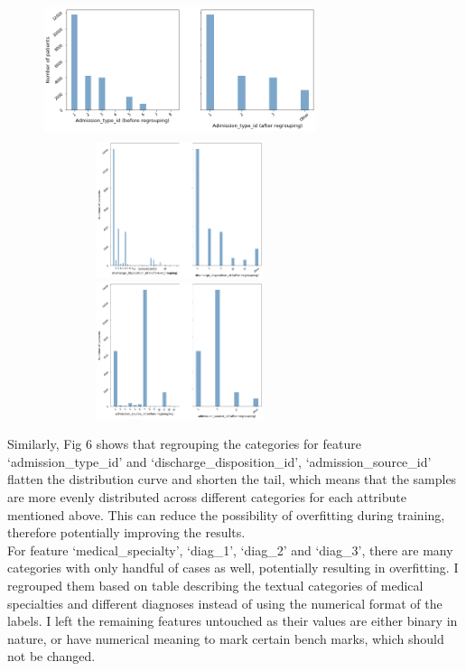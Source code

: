 \documentclass[letterpaper, 12 pt, conference]{ieeeconf}  %
\begin{document}
\begin{figure}[h]
  \includegraphics[width=8cm, height=4cm]{./figs/admin_type.png}
  \includegraphics[width=8cm, height=4cm]{./figs/disc-pos.png}
  \includegraphics[width=8cm, height=4cm]{./figs/admis-source.png}
  \label{fig:boat1}
\end{figure}\newline
Similarly, Fig 6 shows that regrouping the categories for feature `admission\_type\_id' and `discharge\_disposition\_id', `admission\_source\_id' flatten the distribution curve and shorten the tail, which means that the samples are more evenly distributed across different categories for each attribute mentioned above. This can reduce the possibility of overfitting during training, therefore potentially improving the results.\\
\newline
For feature `medical\_specialty', `diag\_1', `diag\_2' and `diag\_3', there are many categories with only handful of  cases as well, potentially resulting in overfitting. I regrouped them based on table describing the textual categories of medical specialties and different diagnoses instead of using the numerical format of the labels. I left the remaining features untouched as their values are either binary in nature, or have numerical meaning to mark certain bench marks, which should not be changed.\\\newline
\end{document}
